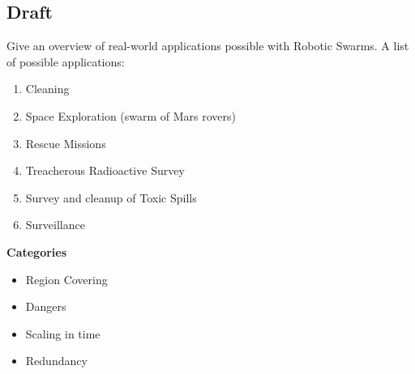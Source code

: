   
  \subsection{Draft}
  Give an overview of real-world applications possible with Robotic Swarms. A list of possible applications:
    \begin{enumerate}
      \item Cleaning
      \item Space Exploration (swarm of Mars rovers)
      \item Rescue Missions
      \item Treacherous Radioactive Survey
      \item Survey and cleanup of Toxic Spills
      \item Surveillance
    \end{enumerate}
  \textbf{Categories}
    \begin{itemize}
      \item Region Covering
      \item Dangers
      \item Scaling in time
      \item Redundancy
    \end{itemize}
  